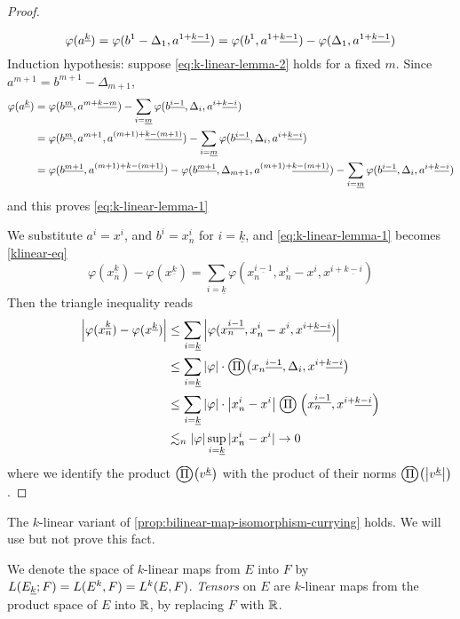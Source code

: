 \documentclass[../main-manifolds.tex]{subfiles}
\begin{document}
\begin{proof}
\begin{note}
\[            \varphi(\UPL{a}[k]) = \varphi(b^1-\Delta_1, \UPL{a}[1+][k-1]) = \varphi(b^1, \UPL{a}[1+][k-1]) - \varphi(\Delta_1,\UPL{a}[1+][k-1])
        \]
        Induction hypothesis: suppose \cref{eq:k-linear-lemma-2} holds for a fixed $m$. Since $a^{m+1} = b^{m+1} - \Delta_{m+1}$, 
        \begin{align*}
            \varphi(\UPL{a}[k]) &= \varphi(\UPL{b}[m],\UPL{a}[m+][k-m]) - \sum_{i=\underline{m}}\varphi(\UPL{b}[i-1],\Delta_i,\UPL{a}[i+][k-i])\\
            &= \varphi(\UPL{b}[m],a^{m+1},\UPL{a}[(m+1)+][k-(m+1)]) - \sum_{i=\underline{m}}\varphi(\UPL{b}[i-1],\Delta_i,\UPL{a}[i+][k-i])\\
            &= \varphi(\UPL{b}[m+1],\UPL{a}[(m+1)+][k-(m+1)]) - \varphi(\UPL{b}[m+1],\Delta_{m+1},\UPL{a}[(m+1)+][k-(m+1)]) - \sum_{i=\underline{m}}\varphi(\UPL{b}[i-1],\Delta_i,\UPL{a}[i+][k-i])
        \end{align*}
        and this proves \cref{eq:k-linear-lemma-1}
    \end{note}
    We substitute $a^i = x^i$, and $b^i = x_n^i$ for $i = \underline{k}$, and \cref{eq:k-linear-lemma-1} becomes \cref{klinear-eq}
    \begin{equation}\label{klinear-eq}
        \varphi(x_n^{\underline{k}}) - \varphi(x^{\underline{k}}) = \sum_{i=\underline{k}}\varphi(x_n^{\underline{i-1}}, x_n^i - x^i, x^{i+\underline{k-i}})
    \end{equation}
    Then the triangle inequality reads
    \begin{align*}
        \abs{\varphi(x_n^{\underline{k}}) - \varphi(x^{\underline{k}})} &\leq \sum_{i=\underline{k}} \abs{\varphi(x_n^{\underline{i-1}}, x_n^i - x^i, x^{i+\underline{k-i}})}\\
        &\leq \sum_{i=\underline{k}}\abs{\varphi}\cdot\bigoprod\qty({\UPL{x_n}[i-1],\Delta_i,\UPL{x}[i+][k-i]})\\
        &\leq \sum_{i=\underline{k}}\abs{\varphi}\cdot\abs{x_n^i - x^i}\bigoprod\qty(x_n^{\underline{i-1}}, x^{i+\underline{k-i}})\\
        &\Lsim_n\vert\varphi\vert\sup_{i=\underline{k}}\vert x_n^i - x^i\vert\to 0
    \end{align*}
    where we identify the product $\bigoprod\qty(\UPL{v}[k])$ with the product of their norms $\bigoprod \qty(\abs{\UPL{v}[k]})$. 
\end{proof}
\begin{remark}
    The $k$-linear variant of \cref{prop:bilinear-map-isomorphism-currying} holds. We will use but not prove this fact.
\end{remark}
\begin{remark}
We denote the space of $k$-linear maps from $E$ into $F$ by $L(\UL{E}[k]; F) = L(E^k, F) = L^k(E,F)$. \emph{Tensors} on $E$ are $k$-linear maps from the product space of $E$ into $\mathbb{R}$, by replacing $F$ with $\mathbb{R}$.
\end{remark}
%
%
\end{document}
